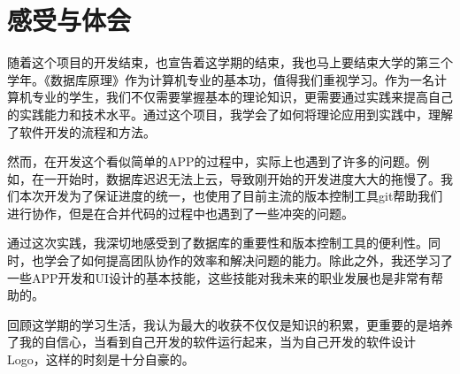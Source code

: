 \documentclass[lang=cn,a4paper,chinesefont=founder,bibend=bibtex]{shu-lab-report}
\begin{document}
\section{感受与体会}

随着这个项目的开发结束，也宣告着这学期的结束，我也马上要结束大学的第三个学年。《数据库原理》作为计算机专业的基本功，值得我们重视学习。作为一名计算机专业的学生，我们不仅需要掌握基本的理论知识，更需要通过实践来提高自己的实践能力和技术水平。通过这个项目，我学会了如何将理论应用到实践中，理解了软件开发的流程和方法。

然而，在开发这个看似简单的APP的过程中，实际上也遇到了许多的问题。例如，在一开始时，数据库迟迟无法上云，导致刚开始的开发进度大大的拖慢了。我们本次开发为了保证进度的统一，也使用了目前主流的版本控制工具git帮助我们进行协作，但是在合并代码的过程中也遇到了一些冲突的问题。

通过这次实践，我深切地感受到了数据库的重要性和版本控制工具的便利性。同时，也学会了如何提高团队协作的效率和解决问题的能力。除此之外，我还学习了一些APP开发和UI设计的基本技能，这些技能对我未来的职业发展也是非常有帮助的。

回顾这学期的学习生活，我认为最大的收获不仅仅是知识的积累，更重要的是培养了我的自信心，当看到自己开发的软件运行起来，当为自己开发的软件设计Logo，这样的时刻是十分自豪的。
\end{document}
